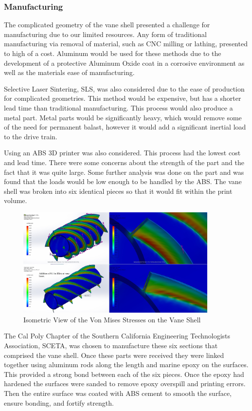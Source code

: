 \documentclass{report}
\begin{document}
\subsubsection{Manufacturing}
The complicated geometry of the vane shell presented a challenge for manufacturing due to our limited resources. Any form of traditional manufacturing via removal of material, such as CNC milling or lathing, presented to high of a cost. Aluminum would be used for these methods due to the development of a protective Aluminum Oxide coat in a corrosive environment as well as the materials ease of manufacturing. \par
Selective Laser Sintering, SLS, was also considered due to the ease of production for complicated geometries. This method would be expensive, but has a shorter lead time than traditional manufacturing. This process would also produce a metal part. Metal parts would be significantly heavy, which would remove some of the need for permanent balast, however it would add a significant inertial load to the drive train.\par
Using an ABS 3D printer was also considered. This process had the lowest cost and lead time. There were some concerns about the strength of the part and the fact that it was quite large. Some further analysis was done on the part and was found that the loads would be low enough to be handled by the ABS. The vane shell was broken into six identical pieces so that it would fit within the print volume. \par
\begin{figure}[H]
\centering
\includegraphics[width=10cm]{"Vane Shell Von Mises Isometric"}
\caption{Isometric View of the Von Mises Stresses on the Vane Shell} 
\end{figure}
The Cal Poly Chapter of the Southern California Engineering Technologists Association, SCETA, was chosen to manufacture these six sections that comprised the vane shell.  Once these parts were received they were linked together using aluminum rods along the length and marine epoxy on the surfaces. This provided a strong bond between each of the six pieces. Once the epoxy had hardened the surfaces were sanded to remove epoxy overspill and printing errors. Then the entire surface was coated with ABS cement to smooth the surface, ensure bonding, and fortify strength.
\end{document}
